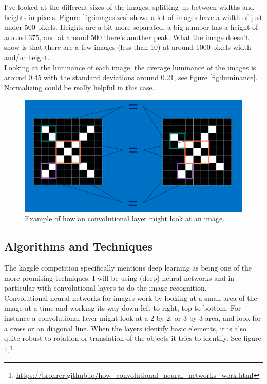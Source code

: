 \documentclass[11pt]{article}
\begin{document}
\begin{figure}
\begin{subfigure}{.515\textwidth}
    \end{subfigure}
\end{figure}
I've looked at the different sizes of the images, splitting up between widths and heights in pixels. Figure \ref{fig:imagesizes} shows a lot of images have a width of just under 500 pixels. Heights are a bit more separated, a big number has a height of around 375, and at around 500 there's another peak. What the image doesn't  show is that there are a few images (less than 10) at around 1000 pixels width and/or height.\\

Looking at the luminance of each image, the average luminance of the images is around 0.45 with the standard deviations around 0.21, see figure \ref{fig:luminance}. Normalizing could be really helpful in this case.

\begin{figure}
    \centering
    \includegraphics[width=\textwidth]{images/cnn3}
    \caption{Example of how an convolutional layer might look at an image.}
    \label{fig:cnn}
\end{figure}

\subsection{Algorithms and Techniques}
The kaggle competition specifically mentions deep learning as being one of the more promising techniques. I will be using (deep) neural networks and in particular with convolutional layers to do the image recognition.\\

Convolutional neural networks for images work by looking at a small area of the image at a time and working its way down left to right, top to bottom. For instance a convolutional layer might look at a 2 by 2, or 3 by 3 area, and look for a cross or an diagonal line. When the layers identify basic elements, it is also quite robust to rotation or translation of the objects it tries to identify. See figure \ref{fig:cnn}.\footnote{\url{https://brohrer.github.io/how_convolutional_neural_networks_work.html}}\\
\end{document}
